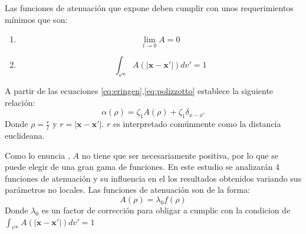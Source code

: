 Las funciones de atenuación que expone \textcite{Polizzotto2001} deben cumplir con unos requerimientos mínimos que son:

\begin{enumerate}
	\item[] \begin{equation}\lim_{l\to0}A=0\end{equation}
	\item[] \begin{equation}\int_{v^{\infty}}A(|\boldsymbol{x}-\boldsymbol{x'}|)dv'=1
	\label{eq:condicion}
	\end{equation}
\end{enumerate}

A partir de las ecuaciones \ref{eq:eringen},\ref{eq:polizzotto} \textcite{Polizzotto2001} establece la siguiente relación:
\begin{equation}
	\alpha(\rho)=\zeta_1A(\rho)+\zeta_1\delta_{x-x'}
\end{equation}
Donde $\rho=\frac{r}{l}$ y $r=|\boldsymbol{x}-\boldsymbol{x'}|$. $r$ es interpretado comúnmente como la distancia euclideana.

Como lo enuncia \textcite{ALTAN19891271}, $A$ no tiene que ser necesariamente positiva, por lo que se puede elegir de una gran gama de funciones. En este estudio se analizarán 4 funciones de atenuación y su influencia en el los resultados obtenidos variando sus parámetros no locales. Las funciones de atenuación son de la forma:
\begin{equation}
	A(\rho)=\lambda_0f(\rho)
\end{equation}
Donde $\lambda_0$ es un factor de corrección para obligar a cumplic con la condicion de $\int_{v^{\infty}}A(|\boldsymbol{x}-\boldsymbol{x'}|)dv'=1$

